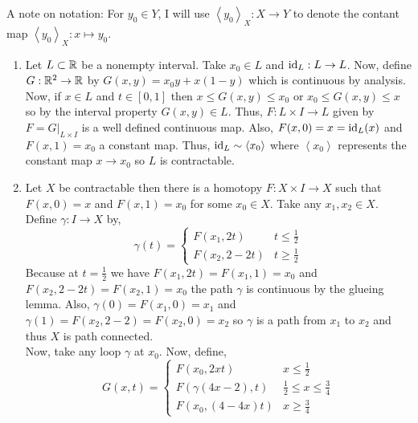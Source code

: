 \documentclass[12pt]{extarticle}
\newcommand{\const}[2]{\left< #1 \right>_{#2}}
\begin{document}
A note on notation: For $y_0 \in Y$, I will use $\const{y_0}{X} : X \to Y$ to denote the contant map $\const{y_0}{X} : x \mapsto y_0$.    
\begin{enumerate}
\item Let $L \subset \mathbb{R}$ be a nonempty interval. Take $x_0 \in L$ and $\mathrm{id}_L : L \to L$. Now, define $G : \mathbb{R}^2 \to \mathbb{R}$ by $G(x, y) = x_0 y + x (1 - y)$ which is continuous by analysis. Now, if $x \in L$ and $t \in [0,1]$ then $x \le G(x,y) \le x_0$ or $x_0 \le G(x,y) \le x$ so by the interval property $G(x,y) \in L$. Thus, $F : L \times I \to L$ given by $F = G|_{L \times I}$ is a well defined continuous map. Also, $F(x, 0) = x = \mathrm{id}_L(x)$ and $F(x, 1) = x_0$ a constant map. Thus, $\mathrm{id}_L \sim \left<x_0\right>$ where $\left<x_0\right>$ represents the constant map $x \to x_0$ so $L$ is contractable.  

\item Let $X$ be contractable then there is a homotopy $F : X \times I \to X$ such that $F(x, 0) = x$ and $F(x, 1) = x_0$ for some $x_0 \in X$. Take any $x_1, x_2 \in X$. Define $\gamma : I \to X$ by,
\[ \gamma(t) =
\begin{cases}
F(x_1, 2t) & t \le \frac{1}{2} \\
F(x_2, 2 - 2t) & t \ge \frac{1}{2}
\end{cases} \]  
Because at $t = \frac{1}{2}$ we have $F(x_1, 2t) = F(x_1, 1) = x_0$ and $F(x_2, 2 - 2t) = F(x_2, 1) = x_0$ the path $\gamma$ is continuous by the glueing lemma. Also, $\gamma(0) = F(x_1, 0) = x_1$ and $\gamma(1) = F(x_2, 2 - 2) = F(x_2, 0) = x_2$ so $\gamma$ is a path from $x_1$ to $x_2$ and thus $X$ is path connected. \bigskip \\
Now, take any loop $\gamma$ at $x_0$. Now, define,
\[ G(x,t) = 
\begin{cases}
F(x_0, 2xt) & x \le \frac{1}{2} \\
F(\gamma(4x - 2), t) & \frac{1}{2} \le x \le \frac{3}{4} \\
F(x_0, (4 - 4x)t) & x \ge \frac{3}{4}
\end{cases} \] 


\end{enumerate}
\end{document}
